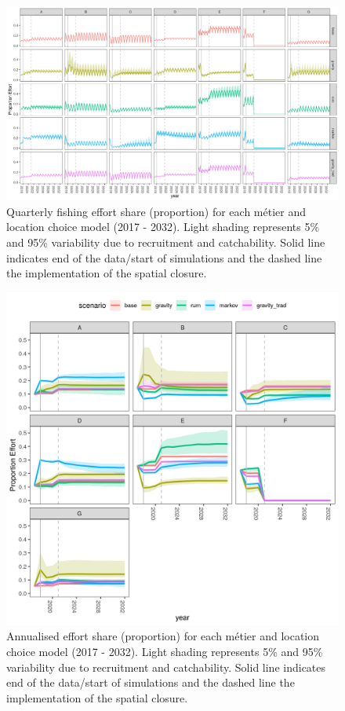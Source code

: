 \documentclass[12pt, halfline, a4paper]{ouparticle}
\begin{document}
\newpage

\begin{figure}
	\centering
	\includegraphics[width=1\linewidth]{figures/Effort_shares}
	\caption{Quarterly fishing effort share (proportion) for each métier
		and location choice model (2017 - 2032). Light shading
		represents 5\% and 95\% variability due to recruitment and
		catchability. Solid line indicates end of the data/start of
		simulations and the dashed line the implementation of the
		spatial closure.} 
	\label{fig:effort}
\end{figure}	

\newpage

\begin{figure}[!ht]
	\centering
	\includegraphics[width=1\linewidth]{figures/Effort_shares_annual}
	\caption{Annualised effort share (proportion) for each métier
		and location choice model (2017 - 2032). Light shading
		represents 5\% and 95\% variability due to recruitment and
		catchability. Solid line indicates end of the data/start of
		simulations and the dashed line the implementation of the
		spatial closure.} 
	\label{fig:effort_an}
\end{figure}	
\end{document}
